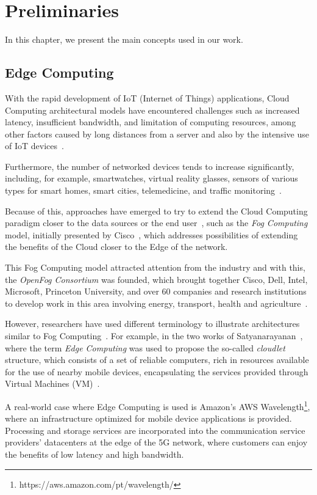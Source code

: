\documentclass[English]{ic-tese-v3}
\begin{document}
\chapter{Preliminaries}
\label{ch:prelim}
In this chapter, we present the main concepts used in our work.

\section{Edge Computing}
\label{sec:edge}
With the rapid development of IoT (Internet of Things) applications, Cloud Computing architectural models have encountered challenges such as increased latency, insufficient bandwidth, and limitation of computing resources, among other factors caused by long distances from a server and also by the intensive use of IoT devices~\cite{YuanPrimer2018, JieGTO2019}.

Furthermore, the number of networked devices tends to increase significantly, including, for example, smartwatches, virtual reality glasses, sensors of various types for smart homes, smart cities, telemedicine, and traffic monitoring~\cite{PanFutureEdge2018}.

Because of this, approaches have emerged to try to extend the Cloud Computing paradigm closer to the data sources or the end user~\cite{BuyyaFogEdge2019}, such as the \emph{Fog Computing} model, initially presented by Cisco~\cite{Cisco2015}, which addresses possibilities of extending the benefits of the Cloud closer to the Edge of the network.

This Fog Computing model attracted attention from the industry and with this, the \emph{OpenFog Consortium} was founded, which brought together Cisco, Dell, Intel, Microsoft, Princeton University, and over 60 companies and research institutions to develop work in this area involving energy, transport, health and agriculture~\cite{BuyyaFogEdge2019}.

However, researchers have used different terminology to illustrate architectures similar to Fog Computing~\cite{BuyyaFogEdge2019}. For example, in the two works of Satyanarayanan~\cite{SatyanaCloudlet2009, SatyanaEdge2017}, where the term \emph{Edge Computing} was used to propose the so-called \emph{cloudlet} structure, which consists of a set of reliable computers, rich in resources available for the use of nearby mobile devices, encapsulating the services provided through Virtual Machines (VM)~\cite{BuyyaFogEdge2019,SatyanaEdge2017}.

A real-world case where Edge Computing is used is Amazon's AWS Wavelength\footnote{https://aws.amazon.com/pt/wavelength/}, where an infrastructure optimized for mobile device applications is provided. Processing and storage services are incorporated into the communication service providers' datacenters at the edge of the 5G network, where customers can enjoy the benefits of low latency and high bandwidth.
\end{document}
